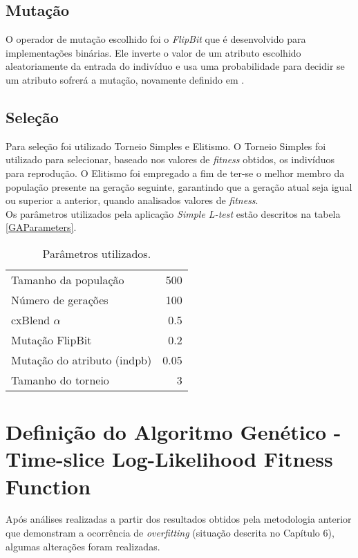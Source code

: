 \subsection{Mutação}

O operador de mutação escolhido foi o {\it FlipBit} que é desenvolvido para implementações binárias. Ele inverte o valor de um atributo escolhido aleatoriamente da entrada do indivíduo e usa uma probabilidade para decidir se um atributo sofrerá a mutação, novamente definido em \cite{Goldberg:1989:GAS:534133}.


\subsection{Seleção}

Para seleção foi utilizado Torneio Simples e Elitismo. O Torneio Simples foi utilizado para selecionar, baseado nos valores de {\it fitness} obtidos, os indivíduos para reprodução. O Elitismo foi empregado a fim de ter-se o melhor membro da população presente na geração seguinte, garantindo que a geração atual seja igual ou superior a anterior, quando analisados valores de {\it fitness}.\\

Os parâmetros utilizados pela aplicação {\it Simple L-test} estão descritos na tabela \ref{GAParameters}.\\

\begin{table}[!h]
  \begin{center}
  \begin{tabular}{|l|r|}
    \hline
    Tamanho da população & 500\\
    Número de gerações & 100\\
    cxBlend $\alpha$ & 0.5\\
    Mutação FlipBit & 0.2\\
    Mutação do atributo (indpb) & 0.05 \\
    Tamanho do torneio & 3\\
    \hline    
  \end{tabular}
  \end{center}
  \caption{Parâmetros utilizados.}
  \label{GAParameters----}
\end{table}

\section{Definição do Algoritmo Genético - Time-slice Log-Likelihood Fitness Function}
Após análises realizadas a partir dos resultados obtidos pela metodologia anterior que demonstram a ocorrência de {\it overfitting} (situação descrita no Capítulo 6), algumas alterações foram realizadas.\\

